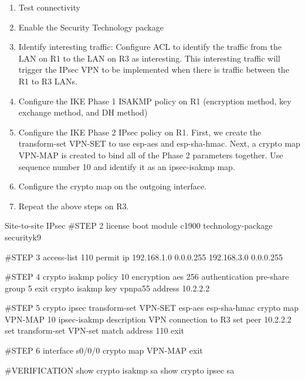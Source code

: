 \begin{enumerate}
\item Test connectivity
\item Enable the Security Technology package
\item Identify interesting traffic: Configure ACL to identify the traffic from the LAN on R1 to the LAN on R3 as interesting. This interesting
traffic will trigger the IPsec VPN to be implemented when there is traffic between the R1 to R3 LANs.
\item Configure the IKE Phase 1 ISAKMP policy on R1 (encryption method, key exchange method, and DH method)
\item Configure the IKE Phase 2 IPsec policy on R1. First, we create the transform-set VPN-SET to use esp-aes and esp-sha-hmac. Next, a crypto map VPN-MAP is created to bind all of the Phase 2 parameters together. Use sequence number 10 and identify it as an ipsec-isakmp map.
\item Configure the crypto map on the outgoing interface.
\item Repeat the above steps on R3.
\end{enumerate}

\begin{sexylisting}{Site-to-site IPsec}
#STEP 2
license boot module c1900 technology-package securityk9

#STEP 3
access-list 110 permit ip 192.168.1.0 0.0.0.255 192.168.3.0
0.0.0.255

#STEP 4
crypto isakmp policy 10
	encryption aes 256
	authentication pre-share
	group 5
	exit
crypto isakmp key vpnpa55 address 10.2.2.2	

#STEP 5
crypto ipsec transform-set VPN-SET esp-aes esp-sha-hmac
crypto map VPN-MAP 10 ipsec-isakmp
	description VPN connection to R3
	set peer 10.2.2.2
	set transform-set VPN-set
	match address 110
	exit

#STEP 6
interface s0/0/0
	crypto map VPN-MAP
	exit

#VERIFICATION
show crypto isakmp sa
show crypto ipsec sa		
\end{sexylisting}
